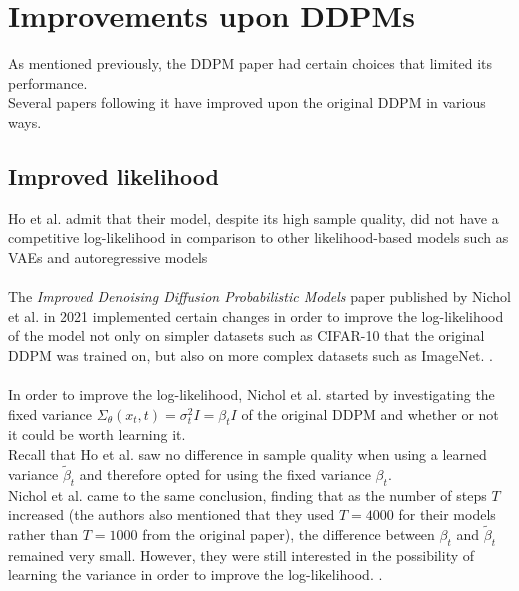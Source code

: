 \documentclass{article}
\begin{document}
\newpage
\section{Improvements upon DDPMs}

As mentioned previously, the DDPM paper \cite{ho2020denoising} had certain choices that limited its performance.\\
Several papers \cite{nichol2021improved, song2022denoising} following it have improved upon the original DDPM in various ways.

\subsection{Improved likelihood}
Ho et al. \cite{ho2020denoising} admit that their model, despite its high sample quality, did not have a competitive log-likelihood in comparison to other likelihood-based models such as VAEs and autoregressive models \cite{nichol2021improved}
\\\\
The \textit{Improved Denoising Diffusion Probabilistic Models} paper published by Nichol et al. \cite{nichol2021improved} in 2021 implemented certain changes in order to improve the log-likelihood of the model not only on simpler datasets such as CIFAR-10 \cite{cifar10} that the original DDPM was trained on, but also on more complex datasets such as ImageNet. \cite{kingma2022autoencoding, oord2016conditional, nichol2021improved}.
\\\\
In order to improve the log-likelihood, Nichol et al. \cite{nichol2021improved} started by investigating the fixed variance $\Sigma_\theta (x_t, t) = \sigma_t^2 I = \beta_t I$ of the original DDPM and whether or not it could be worth learning it. \\
Recall that Ho et al. \cite{ho2020denoising} saw no difference in sample quality when using a learned variance $\tilde{\beta}_t$ and therefore opted for using the fixed variance $\beta_t$. \\
Nichol et al. \cite{nichol2021improved} came to the same conclusion, finding that as the number of steps $T$ increased (the authors also mentioned that they used $T = 4000$ for their models rather than $T = 1000$ from the original paper), the difference between $\beta_t$ and $\tilde{\beta}_t$ remained very small. However, they were still interested in the possibility of learning the variance in order to improve the log-likelihood. \cite{nichol2021improved}. \\
\end{document}
